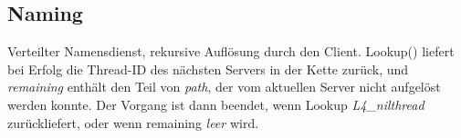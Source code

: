 \subsection{Naming}





Verteilter Namensdienst, rekursive Auflösung durch den Client. Lookup() liefert bei Erfolg die Thread-ID des nächsten Servers in der Kette zurück, und \textit{remaining} enthält den Teil von \textit{path}, der vom aktuellen Server nicht aufgelöst werden konnte. Der Vorgang ist dann beendet, wenn Lookup \textit{L4\_nilthread} zurückliefert, oder wenn remaining \textit{leer} wird.